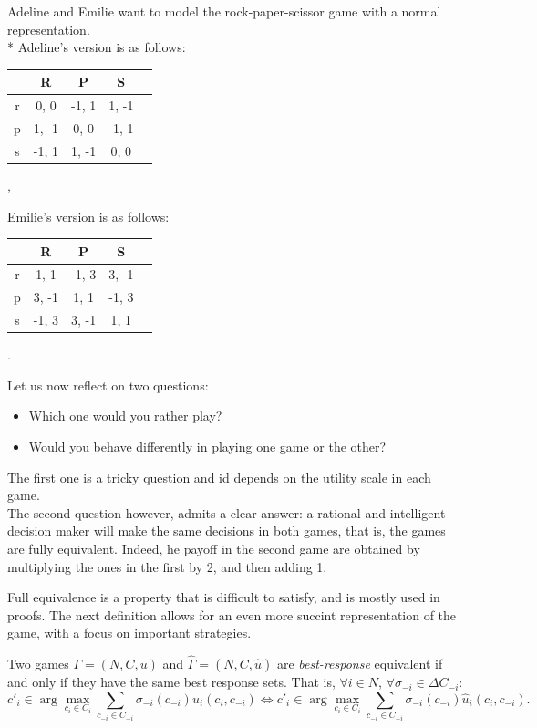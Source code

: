 \begin{example}
Adeline and Emilie want to model the rock-paper-scissor game with a normal representation. \\*
Adeline's version is as follows:
\begin{center}
\begin{tabular}{c|cccc}
   & R &  P & S \\
\hline r & 0, 0 &  -1, 1 & 1, -1 \\
 p & 1, -1 &  0, 0 & -1, 1 \\
 s & -1, 1 &  1, -1 & 0, 0 \\
\end{tabular} ,
\end{center}
Emilie's version is as follows:
\begin{center}
\begin{tabular}{c|cccc}
   & R &  P & S \\
\hline r & 1, 1 &  -1, 3 & 3, -1 \\
 p & 3, -1 &  1, 1 & -1, 3 \\
 s & -1, 3 &  3, -1 & 1, 1 \\
\end{tabular} .
\end{center}
Let us now reflect on two questions:
\begin{itemize}
\item Which one would you rather play?
\item Would you behave differently in playing  one game or the other?
\end{itemize}
The first one is a tricky question and id depends on the utility scale in each game.\\
The second question however, admits a clear answer: a rational and intelligent decision maker will make the same decisions in both games, that is,
the games are fully equivalent. Indeed, he payoff in the second game are obtained by multiplying the ones in the first by 2, and then adding 1.
\end{example}

Full equivalence is a property that is difficult to satisfy, and is mostly used in proofs.
 The next definition allows for an even more succint representation of the game, with a focus on important strategies.
\begin{definition}
Two games $\Gamma=(N, C, u)$ and $\hat \Gamma = (N,C, \hat u)$  are  \textit{best-response} equivalent if and only if
they have the same best response sets.
That is,
$\forall i \in N$, $\forall \sigma_{-i} \in \Delta C_{-i}:$\\
$$ c'_i \in \arg \max_{c_i \in C_i} \sum_{c_{-i} \in C_{-i}}
\sigma_{-i}(c_{-i}) u_i(c_i, c_{-i}) \Leftrightarrow c'_i \in \arg \max_{c_i \in C_i} \sum_{c_{-i} \in C_{-i}}
\sigma_{-i}(c_{-i}) \hat{u}_i(c_i, c_{-i}).
$$
\end{definition}

